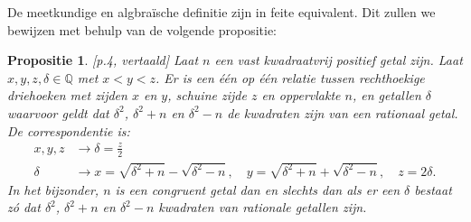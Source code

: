 \documentclass[12pt,reqno]{article}
\newcommand*{\QQ}{\ensuremath{\mathbb{Q}}}
\theoremstyle{theorem}
\newtheorem{proposition}[theorem]{Propositie}
\theoremstyle{definition}
\begin{document}
	De meetkundige en algbra\"ische definitie zijn in feite equivalent. Dit zullen we bewijzen met behulp van de volgende propositie:
	
	\begin{proposition}
		\cite{Koblitz}[p.4, vertaald] Laat $n$ een vast kwadraatvrij positief getal zijn. Laat $x,y,z,\delta \in\QQ$ met $x<y<z$. Er is een \'e\'en op \'e\'en relatie tussen rechthoekige driehoeken met zijden $x$ en $y$, schuine zijde $z$ en oppervlakte $n$, en getallen $\delta$ waarvoor geldt dat $\delta^2$, $\delta^2 +n$ en $\delta^2 -n$ de kwadraten zijn van een rationaal getal. De correspondentie is:
		\begin{align}
			\label{prop:corr1} x,y,z &\rightarrow \delta = \frac{z}{2} \\
			\label{prop:corr2} \delta &\rightarrow x=\sqrt{\delta^2+n} - \sqrt{\delta^2-n},\quad y = \sqrt{\delta^2+n}+\sqrt{\delta^2-n},\quad z = 2\delta.
		\end{align}
		In het bijzonder, $n$ is een congruent getal dan en slechts dan als er een $\delta$ bestaat z\'o dat $\delta^2$, $\delta^2+n$ en $\delta^2-n$ kwadraten van rationale getallen zijn.
	\end{proposition}
\end{document}
